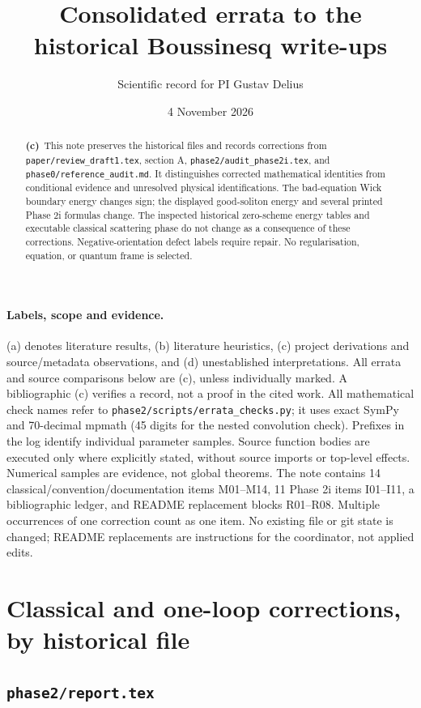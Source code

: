 \documentclass[11pt,a4paper]{article}
\title{Consolidated errata to the historical Boussinesq write-ups}
\author{Scientific record for PI Gustav Delius}
\date{4 November 2026}
\newcommand{\C}{\textbf{(c)}\ }
\newcommand{\file}[1]{\nolinkurl{#1}}
\begin{document}
\maketitle
\begin{abstract}
\C This note preserves the historical files and records corrections from
\file{paper/review_draft1.tex}, section A, \file{phase2/audit_phase2i.tex},
and \file{phase0/reference_audit.md}. It distinguishes corrected mathematical
identities from conditional evidence and unresolved physical identifications.
The bad-equation Wick boundary energy changes sign; the displayed good-soliton
energy and several printed Phase 2i formulas change. The inspected historical
zero-scheme energy tables and executable classical scattering phase do not
change as a consequence of these corrections. Negative-orientation defect
labels require repair. No regularisation, equation, or quantum frame is selected.
\end{abstract}

\paragraph{Labels, scope and evidence.}
(a) denotes literature results, (b) literature heuristics, (c) project derivations
and source/metadata observations, and (d) unestablished interpretations.
All errata and source comparisons below are (c), unless individually marked.
A bibliographic (c) verifies a record, not a proof in the cited work.
All mathematical check names refer to \file{phase2/scripts/errata_checks.py};
it uses exact SymPy and 70-decimal mpmath (45 digits for the nested convolution
check). Prefixes in the log identify individual parameter samples.
Source function bodies are executed only where explicitly stated, without
source imports or top-level effects. Numerical samples are evidence, not global
theorems. The note contains 14 classical/convention/documentation items
M01--M14, 11 Phase 2i items I01--I11, a bibliographic ledger, and README
replacement blocks R01--R08. Multiple occurrences of one correction count as
one item. No existing file or git state is changed; README replacements are
instructions for the coordinator, not applied edits.

\tableofcontents
\newpage
\section{Classical and one-loop corrections, by historical file}

\subsection{\file{phase2/report.tex}}
\end{document}
